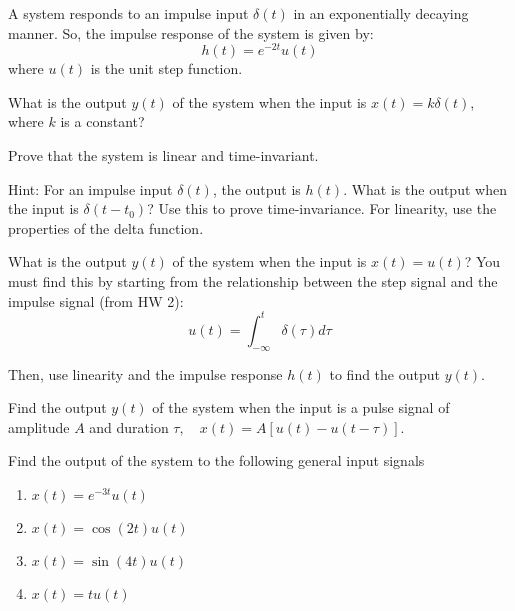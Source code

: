 \documentclass{ee102_pset}
\author{\rule{3cm}{0.4pt}} %
\begin{document}
A system responds to an impulse input $\delta(t)$ in an exponentially decaying manner. So, the impulse response of the system is given by:
\[
h(t) = e^{-2t}u(t)
\]
where $u(t)$ is the unit step function.

\problempart[10 points] What is the output $y(t)$ of the system when the input is $x(t) = k \delta(t)$, where $k$ is a constant?

\problempart[10 points] Prove that the system is linear and time-invariant. 

Hint: For an impulse input $\delta(t)$, the output is $h(t)$. What is the output when the input is $\delta(t - t_0)$? Use this to prove time-invariance. For linearity, use the properties of the delta function.

\problempart[15 points] What is the output $y(t)$ of the system when the input is $x(t) = u(t)$? You must find this by starting from the relationship between the step signal and the impulse signal (from HW 2): 
\[
u(t) = \int_{-\infty}^{t} \delta(\tau) d\tau
\]

Then, use linearity and the impulse response $h(t)$ to find the output $y(t)$.

\problempart[15 points] Find the output $y(t)$ of the system when the input is a pulse signal of amplitude $A$ and duration $\tau, \quad x(t) = A[u(t) - u(t-\tau)]$.

 Find the output of the system to the following general input signals
\begin{enumerate}
    \item $x(t) = e^{-3t}u(t)$
    \item $x(t) = \cos(2t)u(t)$
    \item $x(t) = \sin(4t)u(t)$
    \item $x(t) = t u(t)$
\end{enumerate}




\end{document}
